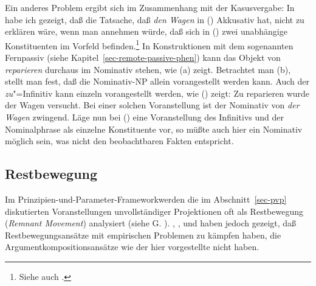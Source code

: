 Ein anderes Problem ergibt sich im Zusammenhang mit der Kasusvergabe:
In  habe ich gezeigt, daß die Tatsache,
daß \emph{den Wagen} in () Akkusativ hat, nicht zu erklären wäre, wenn man annehmen würde,
daß sich in () zwei unabhängige Konstituenten im Vorfeld befinden.\footnote{
  Siehe auch .%
}
\eal 
{}
\zl
In Konstruktionen mit dem sogenannten Fernpassiv (siehe Kapitel~\ref{sec-remote-passive-phen})
kann das Objekt von \emph{reparieren} durchaus im Nominativ stehen, wie (a) zeigt.
Betrachtet man (b), stellt man fest, daß die Nominativ-NP allein vorangestellt werden kann.
\eal
{}
\zl
Auch der \emph{zu}"=Infinitiv kann einzeln vorangestellt werden, wie () zeigt:
\ea
Zu reparieren wurde der Wagen versucht.
\z
Bei einer solchen Voranstellung ist der Nominativ von \emph{der Wagen} zwingend.
Läge nun bei () eine Voranstellung des Infinitivs und der Nominalphrase 
als einzelne Konstituente vor, so müßte auch hier ein Nominativ möglich sein, 
was nicht den beobachtbaren Fakten entspricht.


\subsection{Restbewegung}
\label{sec-restbewegung}

Im Prinzipien-und-Parameter-Framework\indexgb werden die im Abschnitt~\ref{sec-pvp} diskutierten
Voranstellungen unvollständiger Projektionen
oft als Restbewegung (\emph{Remnant Movement}) analysiert (siehe \zb G. \citealp{GMueller96a,GMueller98a}).
\citet[]{Haider93a}, \citet[Kapitel~4.2.5]{deKuthy2002a}, \citet[Abschnitt~2]{dKM2001a} und \citet{Fanselow2002a} haben jedoch gezeigt, 
daß Restbewegungsansätze mit empirischen Problemen zu kämpfen haben, 
die Argumentkompositionsansätze wie der hier vorgestellte nicht haben.%



